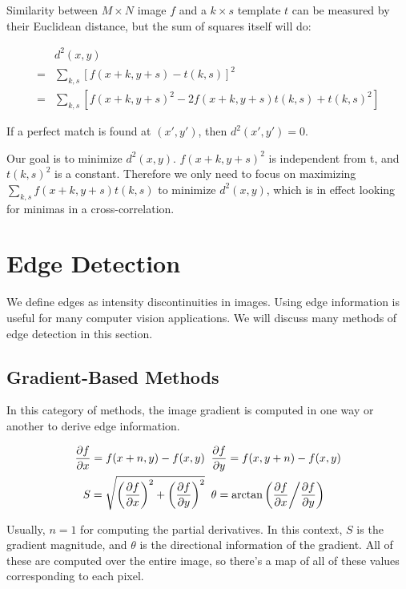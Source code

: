 \documentclass{article}
\begin{document}
\begin{multicols}{2}
Similarity between $M \times N$ image $f$ and a $k \times s$ template $t$ can be measured by their Euclidean distance, but the sum of squares itself will do:

\[
\begin{aligned}
  &d^2(x,y)\\
  =&\sum_{k,s}[f(x+k,y+s) - t(k,s)]^2 \\
  =&\sum_{k,s}[f(x+k,y+s)^2 -2f(x+k,y+s)t(k,s) + t(k,s)^2]
\end{aligned}
\]

If a perfect match is found at $(x',y')$, then $d^2(x',y') = 0$.

Our goal is to minimize $d^2(x,y)$. $f(x+k,y+s)^2$ is independent from t, and $t(k,s)^2$ is a constant. Therefore we only need to focus on maximizing $\sum_{k,s}f(x+k,y+s)t(k,s)$ to minimize $d^2(x,y)$, which is in effect looking for minimas in a cross-correlation.

\section{Edge Detection}

We define edges as intensity discontinuities in images. Using edge information is useful for many computer vision applications. We will discuss many methods of edge detection in this section.

\subsection{Gradient-Based Methods}

In this category of methods, the image gradient is computed in one way or another to derive edge information.

\[
\begin{aligned}
  \frac{\partial f}{\partial x} = f(x+n, y) - f(x,y) \;& \;\frac{\partial f}{\partial y} = f(x, y+n) - f(x,y)\\
  S = \sqrt{\left(\frac{\partial f}{\partial x}\right)^2 + \left(\frac{\partial f}{\partial y}\right)^2} \;&\; \theta = \arctan\left(\frac{\partial f}{\partial x} \middle/ \frac{\partial f}{\partial y}\right)
\end{aligned}
\]

Usually, $n=1$ for computing the partial derivatives. In this context, $S$ is the gradient magnitude, and $\theta$ is the directional information of the gradient. All of these are computed over the entire image, so there's a map of all of these values corresponding to each pixel.


\end{multicols}
\end{document}
